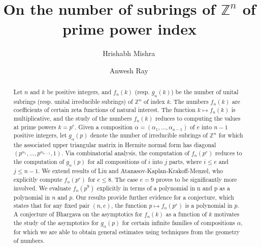 \documentclass[a4paper]{amsart}
\numberwithin{equation}{section}
\theoremstyle{remark}
\newcommand{\Z}{\mathbb{Z}}
\begin{document}
\title[Subrings of $\mathbb{Z}^n$ of prime power index]{On the number of subrings of $\Z^n$ of prime power index}

\author[H.~Mishra]{Hrishabh Mishra\, }
\address[H.~Mishra]{Department of Mathematics
University of Wisconsin-Madison
480 Lincoln Drive, Madison, WI 53706, USA.}

\author[A.~Ray]{Anwesh Ray\, }
\address[Ray]{Chennai Mathematical Institute, H1, SIPCOT IT Park, Kelambakkam, Siruseri, Tamil Nadu 603103, India}



\begin{abstract}
 Let $n$ and $k$ be positive integers, and $f_n(k)$ (resp. $g_n(k)$) be the number of unital subrings (resp. unital irreducible subrings) of $\Z^n$ of index $k$. The numbers $f_n(k)$ are coefficients of certain zeta functions of natural interest. The function $k\mapsto f_n(k)$ is multiplicative, and the study of the numbers $f_n(k)$ reduces to computing the values at prime powers $k=p^e$. Given a composition $\alpha=(\alpha_1, \dots, \alpha_{n-1})$ of $e$ into $n-1$ positive integers, let $g_\alpha(p)$ denote the number of irreducible subrings of $\Z^n$ for which the associated upper triangular matrix in Hermite normal form has diagonal $(p^{\alpha_1}, \dots, p^{\alpha_{n-1}},1)$. Via combinatorial analysis, the computation of $f_n(p^e)$ reduces to the computation of $g_\alpha(p)$ for all compositions of $i$ into $j$ parts, where $i\leq e$ and $j\leq n-1$. We extend results of Liu and Atanasov-Kaplan-Krakoff-Menzel, who explicitly compute $f_n(p^e)$ for $e\leq 8$. The case $e=9$ proves to be significantly more involved. We evaluate $f_n(p^9)$ explicitly in terms of a polynomial in n and p as a polynomial in $n$ and $p$. Our results provide further evidence for a conjecture, which states that for any fixed pair $(n,e)$, the function $p\mapsto f_n(p^e)$ is a polynomial in $p$. A conjecture of Bhargava on the asymptotics for $f_n(k)$ as a function of $k$ motivates the study of the asymptotics for $g_\alpha(p)$ for certain infinite families of compositions $\alpha$, for which we are able to obtain general estimates using techniques from the geometry of numbers.
\end{abstract}

\end{document}
